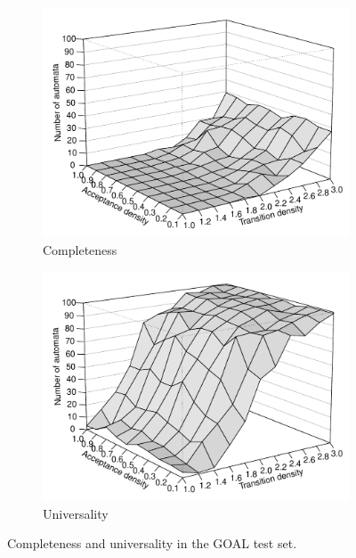 \begin{figure}
  \begin{subfigure}[t]{0.475\textwidth}
  \centering
  \hfil
  \includegraphics[width=\textwidth]{figures/r/completeness/persp.pdf}
  \caption{Completeness}
  \end{subfigure}
  \hfill
  \begin{subfigure}[t]{0.475\textwidth}
  \centering
  \includegraphics[width=\textwidth]{figures/r/universality/persp.pdf}
  \caption{Universality}
  \end{subfigure}
  \hfil
\caption{Completeness and universality in the GOAL test set.}
\end{figure}
\renewcommand{\tabcolsep}{0.2cm}


